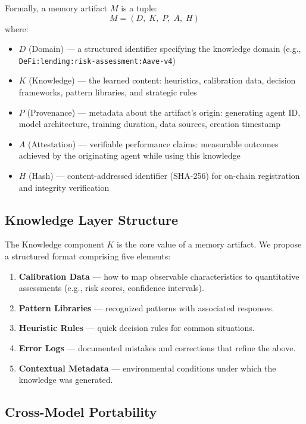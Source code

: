 \documentclass[11pt]{article}
\begin{document}
Formally, a memory artifact $M$ is a tuple:
\begin{equation}
  M = (D,\; K,\; P,\; A,\; H)
\end{equation}
where:
\begin{itemize}[leftmargin=2em]
  \item $D$ (Domain) --- a structured identifier specifying the knowledge domain (e.g., \texttt{DeFi:lending:risk-assessment:Aave-v4})
  \item $K$ (Knowledge) --- the learned content: heuristics, calibration data, decision frameworks, pattern libraries, and strategic rules
  \item $P$ (Provenance) --- metadata about the artifact's origin: generating agent ID, model architecture, training duration, data sources, creation timestamp
  \item $A$ (Attestation) --- verifiable performance claims: measurable outcomes achieved by the originating agent while using this knowledge
  \item $H$ (Hash) --- content-addressed identifier (SHA-256) for on-chain registration and integrity verification
\end{itemize}

\subsection{Knowledge Layer Structure}

The Knowledge component $K$ is the core value of a memory artifact. We propose a structured format comprising five elements:

\begin{enumerate}[leftmargin=2em]
  \item \textbf{Calibration Data} --- how to map observable characteristics to quantitative assessments (e.g., risk scores, confidence intervals).
  \item \textbf{Pattern Libraries} --- recognized patterns with associated responses.
  \item \textbf{Heuristic Rules} --- quick decision rules for common situations.
  \item \textbf{Error Logs} --- documented mistakes and corrections that refine the above.
  \item \textbf{Contextual Metadata} --- environmental conditions under which the knowledge was generated.
\end{enumerate}

\subsection{Cross-Model Portability}
\end{document}
